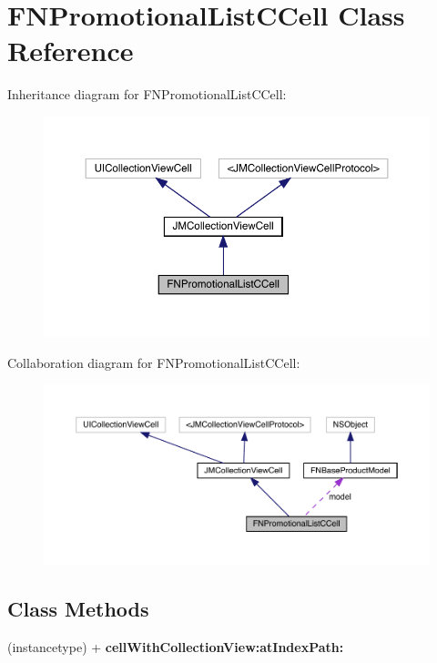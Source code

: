 \hypertarget{interface_f_n_promotional_list_c_cell}{}\section{F\+N\+Promotional\+List\+C\+Cell Class Reference}
\label{interface_f_n_promotional_list_c_cell}


Inheritance diagram for F\+N\+Promotional\+List\+C\+Cell\+:\nopagebreak
\begin{figure}[H]
\begin{center}
\leavevmode
\includegraphics[width=350pt]{interface_f_n_promotional_list_c_cell__inherit__graph}
\end{center}
\end{figure}


Collaboration diagram for F\+N\+Promotional\+List\+C\+Cell\+:\nopagebreak
\begin{figure}[H]
\begin{center}
\leavevmode
\includegraphics[width=350pt]{interface_f_n_promotional_list_c_cell__coll__graph}
\end{center}
\end{figure}
\subsection*{Class Methods}
\begin{DoxyCompactItemize}
\item 
\mbox{\label{interface_f_n_promotional_list_c_cell_a87c68fef6e635c400904741bee81738a}} 
(instancetype) + {\bfseries cell\+With\+Collection\+View\+:at\+Index\+Path\+:}
\end{DoxyCompactItemize}
